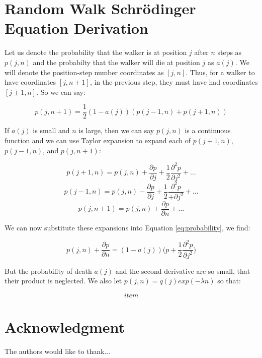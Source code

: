 \documentclass[journal]{IEEEtran}
\begin{document}
\appendices
\section{Random Walk Schr\"{o}dinger Equation Derivation}
Let us denote the probability that the walker is at position $j$ after $n$ steps
as $p(j,n)$ and the probabilty that the walker will die at position $j$ as
$a(j)$. We will denote the position-step number coordinates as $[j, n]$. Thus,
for a walker to have coordinates $[j, n+1]$, in the previous step, they must have
had coordinates $[j \pm 1, n]$. So we can say:

\begin{equation}
  \label{eq:probability}
  p(j, n+1) =  \frac{1}{2}(1-a(j))(p(j-1,n) + p(j+1,n))
\end{equation}

If $a(j)$ is small and $n$ is large, then we can say $p(j, n)$ is a continuous
function and we can use Taylor expansion to expand each of $p(j+1, n)$,
$p(j-1,n)$, and $p(j, n+1)$:

\begin{equation}
  p(j+1, n) = p(j,n) + \frac{\partial p}{\partial j} + \frac{1}{2}
  \frac{\partial^2 p}{\partial j^2} + ...
  \nonumber
\end{equation}
\begin{equation}
  p(j-1, n) = p(j,n) - \frac{\partial p}{\partial j} + \frac{1}{2}
  \frac{\partial^2 p}{+\partial j^2} + ...
  \nonumber
\end{equation}
\begin{equation}
  p(j, n+1) = p(j, n) + \frac{\partial p}{\partial n} + ...
  \nonumber
\end{equation}

We can now substitute these expansions into Equation \ref{eq:probability}, we
find:

\begin{equation}
  p(j, n) + \frac{\partial p}{\partial n} = (1-a(j))\Big(p +
  \frac{1}{2}\frac{\partial^2 p}{\partial j^2}\Big)
  \nonumber
\end{equation}

But the probability of death $a(j)$ and the second derivative are so small, that
their product is neglected. We also let $p(j,n) = q(j) exp(-\lambda n)$ so that:


\begin{equation}
  item
  \nonumber
\end{equation}

\section*{Acknowledgment}
The authors would like to thank...

\printbibliography

\end{document}
